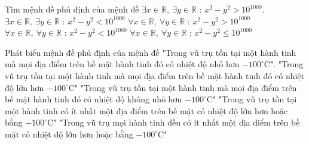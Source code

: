 \begin{ex}%
	Tìm mệnh đề phủ định của mệnh đề
	$\exists x \in \mathbb{R},\ \exists y \in \mathbb{R}  $ : $x^2-y^2 > 10^{1000}$.
	\choice 
	{$\exists x \in \mathbb{R},\ \exists y \in \mathbb{R}  $ : $x^2-y^2 < 10^{1000}$}
	{$\forall x \in \mathbb{R},\ \forall y \in \mathbb{R}  $ : $x^2-y^2 > 10^{1000}$}
	{$\forall x \in \mathbb{R},\ \forall y \in \mathbb{R}  $ : $x^2-y^2  <  10^{1000}$}
	{\True $\forall x \in \mathbb{R},\ \forall y \in \mathbb{R}  $ : $x^2-y^2  \leq  10^{1000}$}
\end{ex}
\begin{ex}%
	Phát biểu mệnh đề phủ định của mệnh đề "Trong vũ trụ tồn tại một hành tinh mà mọi địa điểm trên bề mặt hành tinh đó có nhiệt độ nhỏ hơn $-100^\circ $C".
	\choice 
	{"Trong vũ trụ tồn tại một hành tinh mà mọi địa điểm trên bề mặt hành tinh đó có nhiệt độ lớn hơn $-100^\circ $C"}
	{"Trong vũ trụ tồn tại một hành tinh mà mọi địa điểm trên bề mặt hành tinh đó có nhiệt độ không nhỏ hơn $-100^\circ $C"}
	{"Trong vũ trụ tồn tại một hành tinh có ít nhất một địa điểm trên bề mặt có nhiệt độ lớn hơn hoặc bằng $-100^\circ $C"}
	{\True "Trong vũ trụ mọi hành tinh đều có ít nhất một địa điểm trên bề mặt có nhiệt độ lớn hơn hoặc bằng $-100^\circ $C"}
\end{ex}




